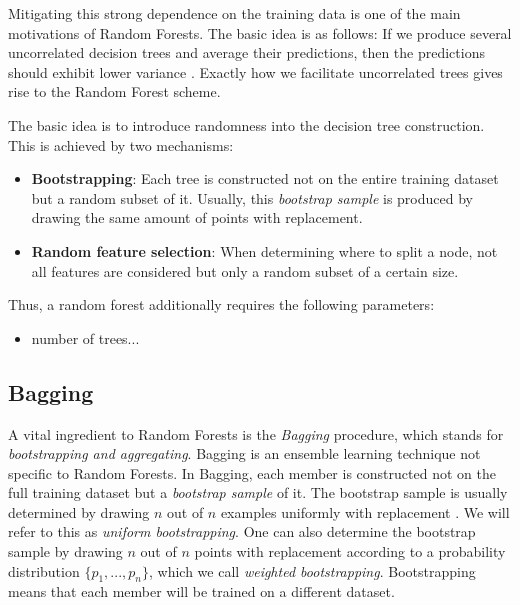 \documentclass[../main.tex]{subfiles}
\begin{document}
Mitigating this strong dependence on the training data is one of the main motivations of Random Forests. The basic idea is as follows: If we produce several uncorrelated decision trees and average their predictions, then the predictions should exhibit lower variance
.  Exactly how we facilitate uncorrelated trees gives rise to the Random Forest scheme.

The basic idea is to introduce randomness into the decision tree construction. This is achieved by two mechanisms:
\begin{itemize}
\item \textbf{Bootstrapping}: Each tree is constructed not on the entire training dataset but a random subset of it. Usually, this \textit{bootstrap sample} is produced by drawing the same amount of points with replacement.
\item \textbf{Random feature selection}: When determining where to split a node, not all features are considered but only a random subset of a certain size.
\end{itemize}

Thus, a random forest additionally requires the following parameters:
\begin{itemize}
\item number of trees...
\end{itemize}




\subsection{Bagging}
\label{sec:bagging}

A vital ingredient to Random Forests is the \textit{Bagging} procedure, which stands for \textit{bootstrapping and aggregating}. Bagging is an ensemble learning technique not specific to Random Forests. In Bagging, each member is constructed not on the full training dataset but a \textit{bootstrap sample} of it. The bootstrap sample is usually determined by drawing $n$ out of $n$ examples uniformly with replacement \cite{breiman,others}. We will refer to this as \textit{uniform bootstrapping}. One can also determine the bootstrap sample by drawing $n$ out of $n$ points with replacement according to a probability distribution $\{p_1, ..., p_n\}$, which we call \textit{weighted bootstrapping}. Bootstrapping means that each member will be trained on a different dataset. 
\end{document}
